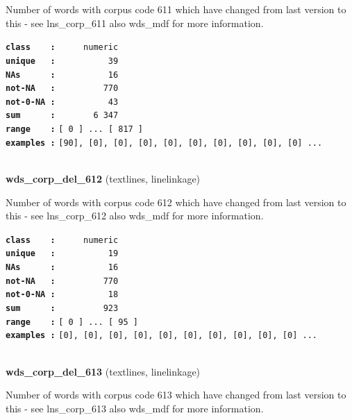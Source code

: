\documentclass[]{article}
\begin{document}
Number of words with corpus code 611 which have changed from last
version to this - see lns\_corp\_611 also wds\_mdf for more information.

\textbf{\texttt{class\ \ \ \ :}} \texttt{~~~~~numeric}\\
\textbf{\texttt{unique\ \ \ :}} \texttt{~~~~~~~~~~39}\\
\textbf{\texttt{NAs\ \ \ \ \ \ :}} \texttt{~~~~~~~~~~16}\\
\textbf{\texttt{not-NA\ \ \ :}} \texttt{~~~~~~~~~770}\\
\textbf{\texttt{not-0-NA\ :}} \texttt{~~~~~~~~~~43}\\
\textbf{\texttt{sum\ \ \ \ \ \ :}} \texttt{~~~~~~~6~347}\\
\textbf{\texttt{range\ \ \ \ :}}
\texttt{{[}\ 0\ {]}\ ...\ {[}\ 817\ {]}}\\
\textbf{\texttt{examples\ :}}
\texttt{{[}90{]},\ {[}0{]},\ {[}0{]},\ {[}0{]},\ {[}0{]},\ {[}0{]},\ {[}0{]},\ {[}0{]},\ {[}0{]},\ {[}0{]}\ ...}\\

~

\textbf{wds\_corp\_del\_612} (textlines, linelinkage)

Number of words with corpus code 612 which have changed from last
version to this - see lns\_corp\_612 also wds\_mdf for more information.

\textbf{\texttt{class\ \ \ \ :}} \texttt{~~~~~numeric}\\
\textbf{\texttt{unique\ \ \ :}} \texttt{~~~~~~~~~~19}\\
\textbf{\texttt{NAs\ \ \ \ \ \ :}} \texttt{~~~~~~~~~~16}\\
\textbf{\texttt{not-NA\ \ \ :}} \texttt{~~~~~~~~~770}\\
\textbf{\texttt{not-0-NA\ :}} \texttt{~~~~~~~~~~18}\\
\textbf{\texttt{sum\ \ \ \ \ \ :}} \texttt{~~~~~~~~~923}\\
\textbf{\texttt{range\ \ \ \ :}}
\texttt{{[}\ 0\ {]}\ ...\ {[}\ 95\ {]}}\\
\textbf{\texttt{examples\ :}}
\texttt{{[}0{]},\ {[}0{]},\ {[}0{]},\ {[}0{]},\ {[}0{]},\ {[}0{]},\ {[}0{]},\ {[}0{]},\ {[}0{]},\ {[}0{]}\ ...}\\

~

\textbf{wds\_corp\_del\_613} (textlines, linelinkage)

Number of words with corpus code 613 which have changed from last
version to this - see lns\_corp\_613 also wds\_mdf for more information.
\end{document}

